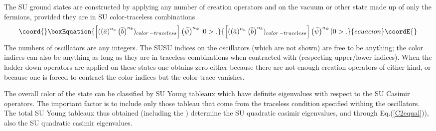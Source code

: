 \documentclass[a4paper,aps,preprint,nofootinbib]{revtex4}
\begin{document}
The SU\coordHE{} ground states are constructed by applying any
number of creation operators \coordHE{} and \coordHE{} on the vacuum or other
state made up of only the fermions, provided they are in SU\coordHE{}
color-traceless combinations
\begin{equation}\coord{}\boxEquation{
\left[ (\left( \bar{a}\right) ^{n_{a}}\left( \bar{b}\right)
^{n_{b}})_{color\,-traceless}\right] \left( \bar{\psi}\right) ^{n_{\psi}}|0>.
}{
\left[ (\left( \bar{a}\right) ^{n_{a}}\left( \bar{b}\right)
^{n_{b}})_{color\,-traceless}\right] \left( \bar{\psi}\right) ^{n_{\psi}}|0>.
}{ecuacion}\coordE{}\end{equation}
The numbers of oscillators \coordHE{} are any integers. The SU\myHighlight{$%
\left( 2\right) \times$}\coordHE{}SU\myHighlight{$\left( 2\right) $}\coordHE{} indices \coordHE{} on the oscillators
(which are not shown) are free to be anything; the color indices \myHighlight{$\alpha$}\coordHE{}
can also be anything as long as they are in traceless combinations when
contracted with \myHighlight{$\delta_{\alpha}^{\beta}$}\coordHE{} (respecting upper/lower indices).
When the ladder down operators \coordHE{} are applied on these
states one obtains zero either because there are not enough creation
operators of either kind, or because one is forced to contract the color
indices but the color trace vanishes.

The overall color of the state can be classified by SU\coordHE{}
Young tableaux which have definite eigenvalues with respect to the SU\coordHE{} Casimir operators. The important factor is to include only those
tableau that come from the traceless condition specified withing the \coordHE{}
oscillators. The total SU\coordHE{} Young tableaux thus obtained
(including the \coordHE{}) determine the SU\coordHE{}
quadratic casimir eigenvalues, and through Eq.(\ref{C2equal})), also the SU\coordHE{} quadratic casimir eigenvalues.
\end{document}
